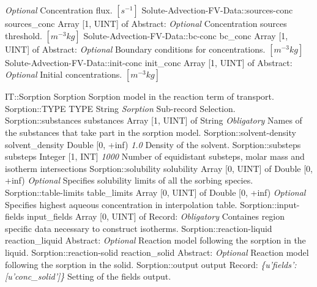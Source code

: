 \begin{RecordType}
			{ \it{Optional} }
			{{{Concentration flux. }{$[s^{-1}]$}}}
		\RecKey
			{Solute-Advection-FV-Data::sources-conc}
			{sources{\_}conc}
			{{Array [1, UINT] of }{Abstract}{: }}
			{ \it{Optional} }
			{{{Concentration sources threshold. }{$[m^{-3}kg]$}}}
		\RecKey
			{Solute-Advection-FV-Data::bc-conc}
			{bc{\_}conc}
			{{Array [1, UINT] of }{Abstract}{: }}
			{ \it{Optional} }
			{{{Boundary conditions for concentrations. }{$[m^{-3}kg]$}}}
		\RecKey
			{Solute-Advection-FV-Data::init-conc}
			{init{\_}conc}
			{{Array [1, UINT] of }{Abstract}{: }}
			{ \it{Optional} }
			{{{Initial concentrations. }{$[m^{-3}kg]$}}}
\end{RecordType}
\begin{RecordType}
	{IT::Sorption}
	{Sorption}
	{} %
	{} %
	{{{Sorption model in the reaction term of transport.}}}
		\RecKey
			{Sorption::TYPE}
			{TYPE}
			{{String}}
			{ \it{Sorption} }
			{{{Sub-record Selection.}}}
		\RecKey
			{Sorption::substances}
			{substances}
			{{Array [1, UINT] of }{String}}
			{ \it{Obligatory} }
			{{{Names of the substances that take part in the sorption model.}}}
		\RecKey
			{Sorption::solvent-density}
			{solvent{\_}density}
			{{Double [0, +inf)}}
			{ \it{1.0} }
			{{{Density of the solvent.}}}
		\RecKey
			{Sorption::substeps}
			{substeps}
			{{Integer [1, INT]}}
			{ \it{1000} }
			{{{Number of equidistant substeps, molar mass and isotherm intersections}}}
		\RecKey
			{Sorption::solubility}
			{solubility}
			{{Array [0, UINT] of }{Double [0, +inf)}}
			{ \it{Optional} }
			{{{Specifies solubility limits of all the sorbing species.}}}
		\RecKey
			{Sorption::table-limits}
			{table{\_}limits}
			{{Array [0, UINT] of }{Double [0, +inf)}}
			{ \it{Optional} }
			{{{Specifies highest aqueous concentration in interpolation table.}}}
		\RecKey
			{Sorption::input-fields}
			{input{\_}fields}
			{{Array [0, UINT] of }{Record}{: }}
			{ \it{Obligatory} }
			{{{Containes region specific data necessary to construct isotherms.}}}
		\RecKey
			{Sorption::reaction-liquid}
			{reaction{\_}liquid}
			{{Abstract}{: }}
			{ \it{Optional} }
			{{{Reaction model following the sorption in the liquid.}}}
		\RecKey
			{Sorption::reaction-solid}
			{reaction{\_}solid}
			{{Abstract}{: }}
			{ \it{Optional} }
			{{{Reaction model following the sorption in the solid.}}}
		\RecKey
			{Sorption::output}
			{output}
			{{Record}{: }}
			{ \it{{\{}u'fields': [u'conc{\_}solid']{\}}} }
			{{{Setting of the fields output.}}}
\end{RecordType}

